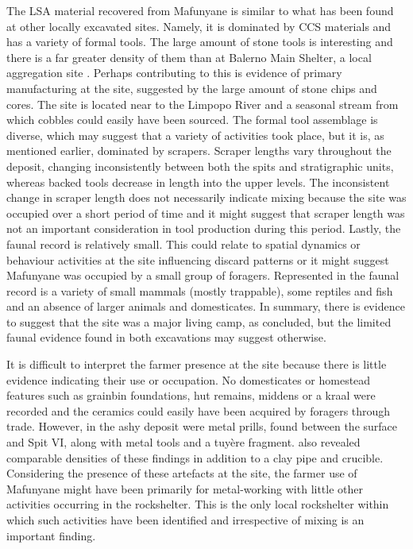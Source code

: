 \documentclass{ijsra}
\begin{document}
The LSA material recovered from Mafunyane is similar to what has been found at other locally excavated sites. Namely, it is dominated by CCS materials and has a variety of formal tools. The large amount of stone tools is interesting and there is a far greater density of them than at Balerno Main Shelter, 
a local aggregation site \parencite{vanDoornum_2008}. Perhaps contributing to this is evidence of primary manufacturing at the site, suggested by the large amount of stone chips and cores. The site is located near to the Limpopo River and a seasonal stream from which cobbles could easily have been sourced. The formal tool assemblage is diverse, 
which may suggest that a variety of activities took place, but it is, as mentioned earlier, dominated by scrapers. Scraper lengths vary throughout the deposit, changing inconsistently between both the spits and stratigraphic units, whereas backed tools decrease in length into the upper levels. The inconsistent change in scraper length does not necessarily indicate mixing because the site was occupied over a short period of time and it might suggest that scraper length was not an important consideration in tool production during this period. Lastly, 
the faunal record is relatively small. This could relate to spatial dynamics or behaviour activities at the site influencing discard patterns or it might suggest Mafunyane was occupied by a small group of foragers. Represented in the faunal record is a variety of small mammals (mostly trappable), some reptiles and fish and an absence of larger animals and domesticates. In summary, there is evidence to suggest that the site was a major living camp, as \textcite{Walker_1994} concluded, but the limited faunal evidence found in both excavations may suggest otherwise.

It is difficult to interpret the farmer presence at the site because there is little evidence indicating their use or occupation. No domesticates or homestead features such as grainbin foundations, hut remains, middens or a kraal were recorded and the ceramics could easily have been acquired by foragers through trade. However, in the ashy deposit were metal prills, found between the surface and Spit VI, along with metal tools and a tuyère fragment. \textcite{Walker_1994} also revealed comparable densities of these findings in addition to a clay pipe and crucible. Considering the presence of these artefacts at the site, the farmer use of Mafunyane might have been primarily for metal-working with little other activities occurring in the rockshelter. This is the only local rockshelter within which such activities have been identified and irrespective of mixing is an important finding.
\end{document}
